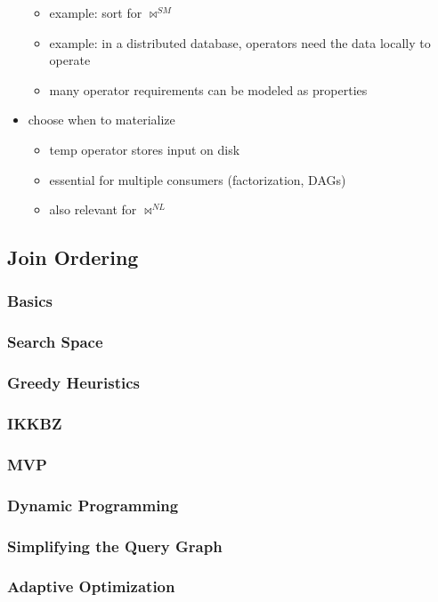 \documentclass[11pt]{article}
\begin{document}
\begin{itemize}
\begin{itemize}
\item example: sort for \(\bowtie^{SM}\)
\item example: in a distributed database, operators need the data locally to operate
\item many operator requirements can be modeled as properties
\end{itemize}
\item choose when to materialize
\begin{itemize}
\item temp operator stores input on disk
\item essential for multiple consumers (factorization, DAGs)
\item also relevant for \(\bowtie^{NL}\)
\end{itemize}
\end{itemize}
\subsection{Join Ordering}
\label{sec:org70c7bb8}
\subsubsection{Basics}
\label{sec:orgde4806f}
\subsubsection{Search Space}
\label{sec:org740500a}
\subsubsection{Greedy Heuristics}
\label{sec:orgc48b09d}
\subsubsection{IKKBZ}
\label{sec:org498fa31}
\subsubsection{MVP}
\label{sec:orge6f93ea}
\subsubsection{Dynamic Programming}
\label{sec:orgbcca9b2}
\subsubsection{Simplifying the Query Graph}
\label{sec:org9fe6bbe}
\subsubsection{Adaptive Optimization}
\label{sec:org87794e1}
\end{document}
